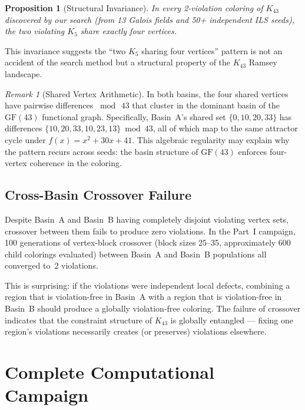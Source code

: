 \documentclass[11pt,a4paper]{article}
\theoremstyle{plain}
\newtheorem{proposition}[theorem]{Proposition}
\theoremstyle{remark}
\newtheorem{remark}[theorem]{Remark}
\newcommand{\GF}{\mathrm{GF}}
\begin{document}
\begin{proposition}[Structural Invariance]\label{prop:invariance}
In every 2-violation coloring of $K_{43}$ discovered by our search
(from 13 Galois fields and 50+ independent ILS seeds), the two
violating $K_5$ share exactly four vertices.
\end{proposition}

This invariance suggests the ``two $K_5$ sharing four vertices''
pattern is not an accident of the search method but a structural
property of the $K_{43}$ Ramsey landscape.

\begin{remark}[Shared Vertex Arithmetic]
In both basins, the four shared vertices have pairwise differences
$\bmod\,43$ that cluster in the dominant basin of the $\GF(43)$
functional graph. Specifically, Basin~A's shared set $\{0,10,20,33\}$
has differences $\{10, 20, 33, 10, 23, 13\} \bmod 43$, all of which
map to the same attractor cycle under $f(x) = x^2 + 30x + 41$.
This algebraic regularity may explain why the pattern recurs across
seeds: the basin structure of $\GF(43)$ enforces four-vertex
coherence in the coloring.
\end{remark}

\subsection{Cross-Basin Crossover Failure}

Despite Basin~A and Basin~B having completely disjoint violating
vertex sets, crossover between them fails to produce zero violations.
In the Part~I campaign, 100 generations of vertex-block crossover
(block sizes 25--35, approximately 600 child colorings evaluated)
between Basin~A and Basin~B populations all converged to~2 violations.

This is surprising: if the violations were independent local defects,
combining a region that is violation-free in Basin~A with a region
that is violation-free in Basin~B should produce a globally
violation-free coloring. The failure of crossover indicates that the
constraint structure of $K_{43}$ is globally entangled --- fixing one
region's violations necessarily creates (or preserves) violations
elsewhere.

\section{Complete Computational Campaign}
\label{sec:campaign}
\end{document}
